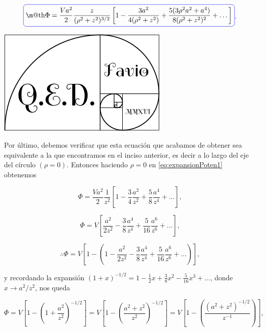 \documentclass[a4paper,11pt]{article}
\makeatletter
\numberwithin{equation}{section}
\newcommand*{\boxcolor}{blue}
\renewcommand{\boxed}[1]{\textcolor{\boxcolor}{%
\tikz[baseline={([yshift=-1ex]current bounding box.center)}] \node [rectangle, minimum width=1ex,rounded corners,draw] {\normalcolor\m@th$\displaystyle#1$};}}
\makeatother
\begin{document}
\begin{equation}
 \boxed{\Phi = \frac{Va^2}{2}\frac{z}{(\rho^2 + z^2)^{3/2}}\left[1 - 
 \frac{3a^2}{4(\rho^2 + z^2)} + \frac{5(3\rho^2a^2+a^4)}{8(\rho^2 + z^2)^2} 
 + \dots \right]}.
 \label{eq:expansionPoten1}
\end{equation}

\hspace{10cm}\includegraphics[scale=0.2]{logoQED}

\vspace{.5cm}

Por último, debemos verificar que esta ecuación que acabamos de obtener 
sea equivalente a la que encontramos en el inciso anterior, es decir 
a lo largo del eje del círculo $(\rho = 0)$. Entonces haciendo $\rho = 0$ 
en \eqref{eq:expansionPoten1} obtenemos 

\begin{equation}
 \Phi = \frac{Va^2}{2}\frac{1}{z^2}
 \left[1 - \frac{3}{4}\frac{a^2}{z^2} + 
 \frac{5}{8}\frac{a^4}{z^4} + \dots \right],
\end{equation}

\begin{equation}
 \Phi = V\left[\frac{a^2}{2z^2} - 
 \frac{3}{8}\frac{a^4}{z^4} + 
 \frac{5}{16}\frac{a^6}{z^6} + \dots \right],
\end{equation}

\begin{equation}
 \therefore \Phi = V\left[1 - \left(1 - \frac{a^2}{2z^2} - 
 \frac{3}{8}\frac{a^4}{z^4} + 
 \frac{5}{16}\frac{a^6}{z^6} + \dots  \right) \right],
\end{equation}

y recordando la expansión $(1 + x)^{-1/2} = 1 - \frac{1}{2}x + 
\frac{3}{8}x^2 - \frac{5}{16}x^3 + \dots$, donde $x \rightarrow a^2/z^2$, 
nos queda 

\begin{equation*}
 \Phi = V\left[1 - \left(1 + \frac{a^2}{z^2} \right)^{-1/2} \right] = 
 V\left[1 - \left(\frac{a^2+z^2}{z^2} \right)^{-1/2} \right] = 
 V\left[1 - \left(\frac{(a^2+z^2)^{-1/2}}{z^{-1}} \right) \right],
\end{equation*}
\end{document}
